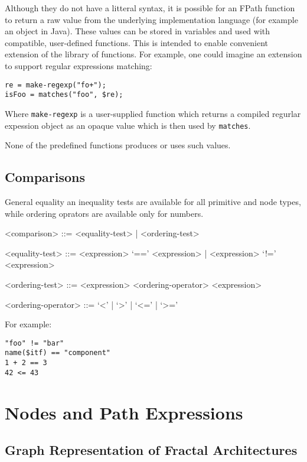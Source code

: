 \documentclass[a4paper,12pt]{report}
\begin{document}
Although they do not have a litteral syntax, it is possible for an FPath function to
return a raw value from the underlying implementation language (for example an object in
Java). These values can be stored in variables and used with compatible, user-defined
functions. This is intended to enable convenient extension of the library of functions.
For example, one could imagine an extension to support regular expressions matching:

\begin{verbatim}
re = make-regexp("fo+");
isFoo = matches("foo", $re);
\end{verbatim}%

Where \texttt{make-regexp} is a user-supplied function which returns a compiled regurlar
expession object as an opaque value which is then used by \texttt{matches}.

None of the predefined functions produces or uses such values.

\subsection{Comparisons}
\label{sec:comp-and-bool}

General equality an inequality tests are available for all primitive and node types, while
ordering oprators are available only for numbers.

\begin{grammar}
<comparison> ::= <equality-test> | <ordering-test>

<equality-test> ::= <expression> `==' <expression> | <expression> `!=' <expression>

<ordering-test> ::= <expression> <ordering-operator> <expression>

<ordering-operator> ::= `<' | `>' | `<=' | `>='
\end{grammar}

For example:
\begin{verbatim}
"foo" != "bar"
name($itf) == "component"
1 + 2 == 3
42 <= 43
\end{verbatim}

\section{Nodes and Path Expressions}
\label{sec:nodes-and-paths}

\subsection{Graph Representation of Fractal Architectures}
\label{sec:graph-model}
\end{document}

